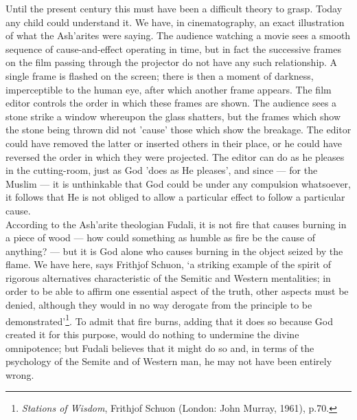 \documentclass[10pt, twoside,openright]{book}
\begin{document}
Until the present century this must have been a difficult theory to grasp. Today any child could 
understand it. We have, in cinematography, an exact illustration of what the Ash'arites were saying. 
The audience watching a movie sees a smooth sequence of cause\hyp{}and\hyp{}effect operating in time, but in 
fact the successive frames on the film passing through the projector do not have any such 
relationship. A single frame is flashed on the screen; there is then a moment of darkness, 
imperceptible to the human eye, after which another frame appears. The film editor controls the order 
in which these frames are shown. The audience sees a stone strike a window whereupon the glass 
shatters, but the frames which show the stone being thrown did not 'cause' those which show the 
breakage. The editor could have removed the latter or inserted others in their place, or he could 
have reversed the order in which they were projected. The editor can do as he pleases in the 
cutting-room, just as God 'does as He pleases', and since --- for the Muslim --- it is unthinkable that 
God could be under any compulsion whatsoever, it follows that He is not obliged to allow a particular 
effect to follow a particular cause. \\

According to the Ash'arite theologian Fudali, it is not fire that causes burning in a piece of wood --- 
how could something as humble as fire be the cause of anything? --- but it is God alone who causes 
burning in the object seized by the flame. We have here, says Frithjof Schuon, `a striking example of 
the spirit of rigorous alternatives characteristic of the Semitic and Western mentalities; in order 
to be able to affirm one essential aspect of the truth, other aspects must be denied, although they 
would in no way derogate from the principle to be demonstrated'\footnote{\emph{Stations of Wisdom}, Frithjof Schuon (London: John Murray, 1961), p.70.}. To admit that fire burns, adding 
that it does so because God created it for this purpose, would do nothing to undermine the divine 
omnipotence; but Fudali believes that it might do so and, in terms of the psychology of the Semite 
and of Western man, he may not have been entirely wrong. \\
\end{document}
